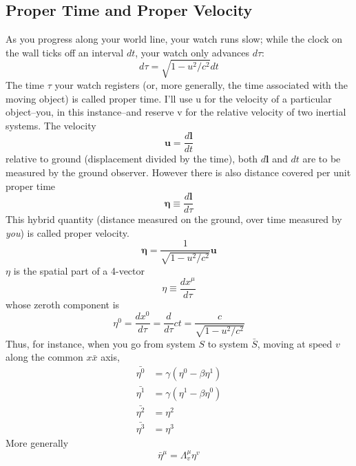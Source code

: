 \documentclass[../main.tex]{subfiles}
\begin{document}
\subsection*{Proper Time and Proper Velocity}
As you progress along your world line, your watch runs slow; while the clock on the wall ticks off an interval $dt$, your watch only advances $d\tau$:
\begin{equation*}
    d\tau=\sqrt{1 - u^2/c^2}dt
\end{equation*}
The time $\tau$ your watch registers (or, more generally, the time associated with the moving object) is called proper time. I'll use u for the velocity of a particular object--you, in this instance--and reserve v for the relative velocity of two inertial systems.  The velocity
\begin{equation*}
    \mathbf{u}=\frac{d\mathbf{l}}{dt}
\end{equation*}
relative to ground (displacement divided by the time), both $d\mathbf{l}$ and $dt$ are to be measured by the ground observer.  However there is also distance covered per unit proper time
\begin{equation*}
    \boldsymbol{\eta}\equiv \frac{d\mathbf{l}}{d\tau}
\end{equation*}
This hybrid quantity (distance measured on the ground, over time measured by \emph{you}) is called proper velocity. 
\begin{equation*}
    \boldsymbol{\eta}= \frac{1}{\sqrt{1 - u^2/c^2}}\mathbf{u}
\end{equation*}
$\eta$ is the spatial part of a 4-vector
\begin{equation*}
    \eta\equiv\frac{dx^{\mu}}{d\tau}
\end{equation*}
whose zeroth component is
\begin{equation*}
    \eta^0=\frac{dx^{0}}{d\tau}=\frac{d}{d\tau}ct=\frac{c}{\sqrt{1 - u^2/c^2}}
\end{equation*}
Thus, for instance, when you go from system $S$ to system $\bar{S}$, moving at speed $v$ along the common $x\bar{x}$ axis,
\begin{align*}
    \bar{\eta^0} &= \gamma (\eta^0 - \beta \eta^1)\\
    \bar{\eta^1} &= \gamma(\eta^1-\beta \eta^0)\\
    \bar{\eta^2} &=\eta^2\\
    \bar{\eta^3}&=\eta^3
\end{align*}
More generally
\begin{equation*}
    \bar{\eta}^{\mu}=\Lambda_{v}^{\mu}\eta^v
\end{equation*}
\end{document}
